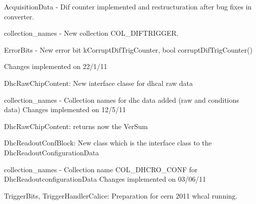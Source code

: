 \begin{DoxyItemize}
\item Acquisition\-Data -\/ Dif counter implemented and restructuration after bug fixes in converter. \par

\item collection\-\_\-names -\/ New collection C\-O\-L\-\_\-\-D\-I\-F\-T\-R\-I\-G\-G\-E\-R.\par

\item Error\-Bits -\/ New error bit k\-Corrupt\-Dif\-Trig\-Counter, bool corrupt\-Dif\-Trig\-Counter() \par
  Changes implemented on 22/1/11  \par

\item Dhc\-Raw\-Chip\-Content\-: New interface classe for dhcal raw data
\item collection\-\_\-names -\/ Collection names for dhc data added (raw and conditions data)  Changes implemented on 12/5/11  \par

\item Dhc\-Raw\-Chip\-Content\-: returns now the Ver\-Sum
\item Dhc\-Readout\-Conf\-Block\-: New class which is the interface class to the Dhc\-Readout\-Configuration\-Data
\item collection\-\_\-names -\/ Collection name C\-O\-L\-\_\-\-D\-H\-C\-R\-O\-\_\-\-C\-O\-N\-F for Dhc\-Readoutconfiguration\-Data  Changes implemented on 03/06/11  \par

\item Trigger\-Bits, Trigger\-Handler\-Calice\-: Preparation for cern 2011 whcal running. 
\end{DoxyItemize}
